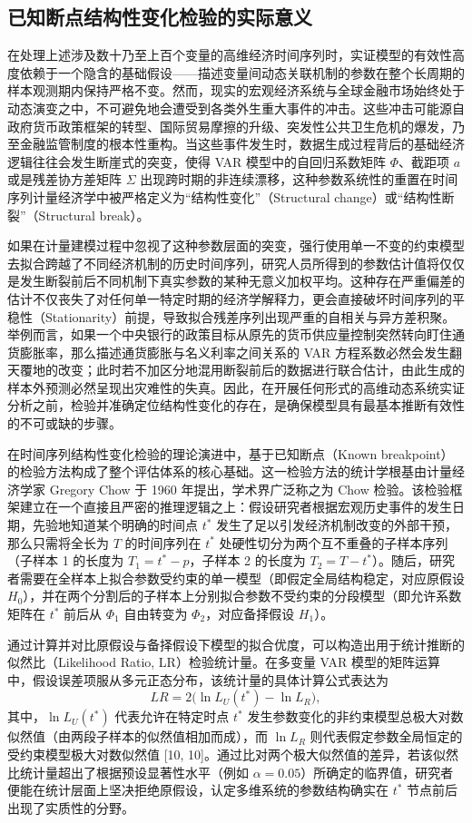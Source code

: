 \documentclass[UTF8,a4paper,12pt]{ctexbook}
\begin{document}
\subsection{已知断点结构性变化检验的实际意义}

在处理上述涉及数十乃至上百个变量的高维经济时间序列时，实证模型的有效性高度依赖于一个隐含的基础假设——描述变量间动态关联机制的参数在整个长周期的样本观测期内保持严格不变。然而，现实的宏观经济系统与全球金融市场始终处于动态演变之中，不可避免地会遭受到各类外生重大事件的冲击。这些冲击可能源自政府货币政策框架的转型、国际贸易摩擦的升级、突发性公共卫生危机的爆发，乃至金融监管制度的根本性重构。当这些事件发生时，数据生成过程背后的基础经济逻辑往往会发生断崖式的突变，使得 VAR 模型中的自回归系数矩阵 $\Phi$、截距项 $a$ 或是残差协方差矩阵 $\Sigma$ 出现跨时期的非连续漂移，这种参数系统性的重置在时间序列计量经济学中被严格定义为“结构性变化”（Structural change）或“结构性断裂”（Structural break）。

如果在计量建模过程中忽视了这种参数层面的突变，强行使用单一不变的约束模型去拟合跨越了不同经济机制的历史时间序列，研究人员所得到的参数估计值将仅仅是发生断裂前后不同机制下真实参数的某种无意义加权平均。这种存在严重偏差的估计不仅丧失了对任何单一特定时期的经济学解释力，更会直接破坏时间序列的平稳性（Stationarity）前提，导致拟合残差序列出现严重的自相关与异方差积聚。举例而言，如果一个中央银行的政策目标从原先的货币供应量控制突然转向盯住通货膨胀率，那么描述通货膨胀与名义利率之间关系的 VAR 方程系数必然会发生翻天覆地的改变；此时若不加区分地混用断裂前后的数据进行联合估计，由此生成的样本外预测必然呈现出灾难性的失真。因此，在开展任何形式的高维动态系统实证分析之前，检验并准确定位结构性变化的存在，是确保模型具有最基本推断有效性的不可或缺的步骤。

在时间序列结构性变化检验的理论演进中，基于已知断点（Known breakpoint）的检验方法构成了整个评估体系的核心基础。这一检验方法的统计学根基由计量经济学家 Gregory Chow 于 1960 年提出，学术界广泛称之为 Chow 检验。该检验框架建立在一个直接且严密的推理逻辑之上：假设研究者根据宏观历史事件的发生日期，先验地知道某个明确的时间点 $t^*$ 发生了足以引发经济机制改变的外部干预，那么只需将全长为 $T$ 的时间序列在 $t^*$ 处硬性切分为两个互不重叠的子样本序列（子样本 1 的长度为 $T_1=t^*-p$，子样本 2 的长度为 $T_2=T-t^*$）。随后，研究者需要在全样本上拟合参数受约束的单一模型（即假定全局结构稳定，对应原假设 $H_0$），并在两个分割后的子样本上分别拟合参数不受约束的分段模型（即允许系数矩阵在 $t^*$ 前后从 $\Phi_1$ 自由转变为 $\Phi_2$，对应备择假设 $H_1$）。

通过计算并对比原假设与备择假设下模型的拟合优度，可以构造出用于统计推断的似然比（Likelihood Ratio, LR）检验统计量。在多变量 VAR 模型的矩阵运算中，假设误差项服从多元正态分布，该统计量的具体计算公式表达为
\begin{equation}
LR = 2\bigl(\ln L_U(t^*) - \ln L_R\bigr),
\end{equation}
其中，$\ln L_U(t^*)$ 代表允许在特定时点 $t^*$ 发生参数变化的非约束模型总极大对数似然值（由两段子样本的似然值相加而成），而 $\ln L_R$ 则代表假定参数全局恒定的受约束模型极大对数似然值 [10, 10]。通过比对两个极大似然值的差异，若该似然比统计量超出了根据预设显著性水平（例如 $\alpha=0.05$）所确定的临界值，研究者便能在统计层面上坚决拒绝原假设，认定多维系统的参数结构确实在 $t^*$ 节点前后出现了实质性的分野。
\end{document}
